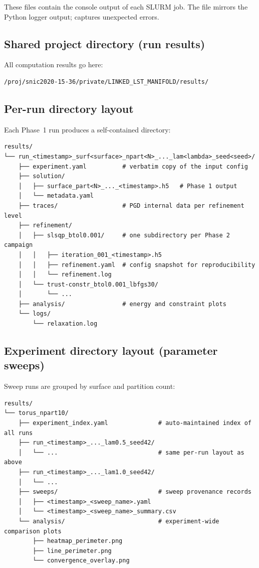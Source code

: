 \documentclass[11pt,a4paper]{article}
\begin{document}
These files contain the console output of each SLURM job.  The 
file mirrors the Python logger output;  captures unexpected
errors.

\subsection{Shared project directory (run results)}

All computation results go here:

\begin{lstlisting}[style=shell]
/proj/snic2020-15-36/private/LINKED_LST_MANIFOLD/results/
\end{lstlisting}

\subsection{Per-run directory layout}

Each Phase~1 run produces a self-contained directory:

\begin{lstlisting}[style=shell]
results/
└── run_<timestamp>_surf<surface>_npart<N>_..._lam<lambda>_seed<seed>/
    ├── experiment.yaml          # verbatim copy of the input config
    ├── solution/
    │   ├── surface_part<N>_..._<timestamp>.h5   # Phase 1 output
    │   └── metadata.yaml
    ├── traces/                  # PGD internal data per refinement level
    ├── refinement/
    │   ├── slsqp_btol0.001/     # one subdirectory per Phase 2 campaign
    │   │   ├── iteration_001_<timestamp>.h5
    │   │   ├── refinement.yaml  # config snapshot for reproducibility
    │   │   └── refinement.log
    │   └── trust-constr_btol0.001_lbfgs30/
    │       └── ...
    ├── analysis/                # energy and constraint plots
    └── logs/
        └── relaxation.log
\end{lstlisting}

\subsection{Experiment directory layout (parameter sweeps)}

Sweep runs are grouped by surface and partition count:

\begin{lstlisting}[style=shell]
results/
└── torus_npart10/
    ├── experiment_index.yaml              # auto-maintained index of all runs
    ├── run_<timestamp>_..._lam0.5_seed42/
    │   └── ...                            # same per-run layout as above
    ├── run_<timestamp>_..._lam1.0_seed42/
    │   └── ...
    ├── sweeps/                            # sweep provenance records
    │   ├── <timestamp>_<sweep_name>.yaml
    │   └── <timestamp>_<sweep_name>_summary.csv
    └── analysis/                          # experiment-wide comparison plots
        ├── heatmap_perimeter.png
        ├── line_perimeter.png
        └── convergence_overlay.png
\end{lstlisting}
\end{document}
